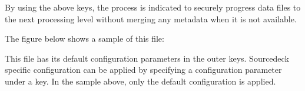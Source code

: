 \documentclass[letterpaper,10pt,english]{sphinxmanual}
\begin{document}
By using the above keys, the process is indicated to securely progress data files
to the next processing level without merging any metadata when it is not available.

The figure below shows a sample of this file:

\begin{sphinxVerbatim}[commandchars=\\\{\}]
   
   
   
    
    
    
    
\end{sphinxVerbatim}

This file has its default configuration parameters in the outer keys.
Source\sphinxhyphen{}deck specific configuration can be applied by specifying a configuration
parameter under a  key. In the sample above, only the default
configuration is applied.
\end{document}
